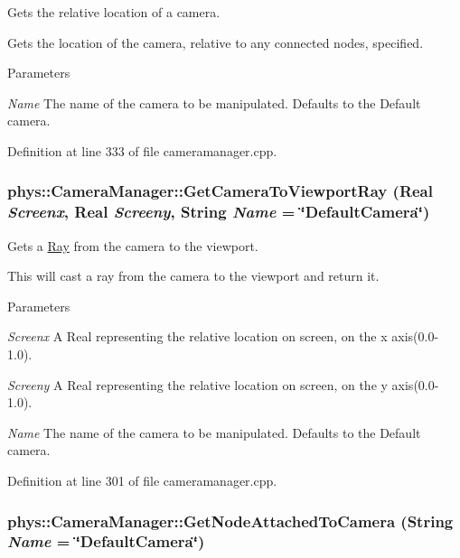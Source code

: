 Gets the relative location of a camera. 

Gets the location of the camera, relative to any connected nodes, specified. 
\begin{DoxyParams}{Parameters}
\item[{\em Name}]The name of the camera to be manipulated. Defaults to the Default camera. \end{DoxyParams}


Definition at line 333 of file cameramanager.cpp.

\hypertarget{classphys_1_1CameraManager_a1a631eee22a0e45e2e72727d0bcc3560}{
\subsubsection[{GetCameraToViewportRay}]{ phys::CameraManager::GetCameraToViewportRay ({\bf Real} {\em Screenx}, \/  {\bf Real} {\em Screeny}, \/  {\bf String} {\em Name} = {\ttfamily \char`\"{}DefaultCamera\char`\"{}})}}
\label{d9/d91/classphys_1_1CameraManager_a1a631eee22a0e45e2e72727d0bcc3560}


Gets a \hyperlink{classphys_1_1Ray}{Ray} from the camera to the viewport. 

This will cast a ray from the camera to the viewport and return it. 
\begin{DoxyParams}{Parameters}
\item[{\em Screenx}]A Real representing the relative location on screen, on the x axis(0.0-\/1.0). \item[{\em Screeny}]A Real representing the relative location on screen, on the y axis(0.0-\/1.0). \item[{\em Name}]The name of the camera to be manipulated. Defaults to the Default camera. \end{DoxyParams}


Definition at line 301 of file cameramanager.cpp.

\hypertarget{classphys_1_1CameraManager_a52a62fcfbeed45a2f527f626731ddcc1}{
\subsubsection[{GetNodeAttachedToCamera}]{ phys::CameraManager::GetNodeAttachedToCamera ({\bf String} {\em Name} = {\ttfamily \char`\"{}DefaultCamera\char`\"{}})}}
\label{d9/d91/classphys_1_1CameraManager_a52a62fcfbeed45a2f527f626731ddcc1}


